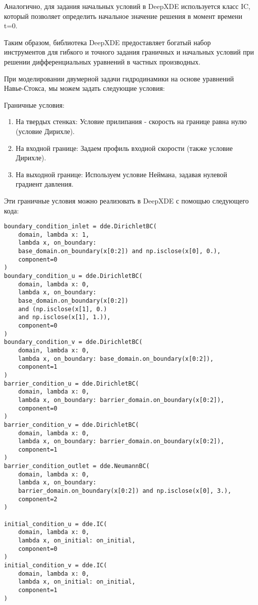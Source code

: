 Аналогично, для задания начальных условий в DeepXDE используется класс IC, который позволяет определить начальное значение
решения в момент времени t=0.

Таким образом, библиотека DeepXDE предоставляет богатый набор инструментов для гибкого и точного задания граничных и начальных
условий при решении дифференциальных уравнений в частных производных.

При моделировании двумерной задачи гидродинамики на основе уравнений Навье-Стокса, мы можем задать следующие условия:

Граничные условия:
\begin{enumerate}
    \item На твердых стенках: Условие прилипания - скорость на границе равна нулю (условие Дирихле).
    \item На входной границе: Задаем профиль входной скорости (также условие Дирихле).
    \item На выходной границе: Используем условие Неймана, задавая нулевой градиент давления.
\end{enumerate}
Эти граничные условия можно реализовать в DeepXDE с помощью следующего кода:
\begin{verbatim}
boundary_condition_inlet = dde.DirichletBC(
    domain, lambda x: 1,
    lambda x, on_boundary: 
    base_domain.on_boundary(x[0:2]) and np.isclose(x[0], 0.),
    component=0
)
boundary_condition_u = dde.DirichletBC(
    domain, lambda x: 0,
    lambda x, on_boundary: 
    base_domain.on_boundary(x[0:2]) 
    and (np.isclose(x[1], 0.) 
    and np.isclose(x[1], 1.)),
    component=0
)
boundary_condition_v = dde.DirichletBC(
    domain, lambda x: 0, 
    lambda x, on_boundary: base_domain.on_boundary(x[0:2]),
    component=1
)
barrier_condition_u = dde.DirichletBC(
    domain, lambda x: 0, 
    lambda x, on_boundary: barrier_domain.on_boundary(x[0:2]),
    component=0
)
barrier_condition_v = dde.DirichletBC(
    domain, lambda x: 0, 
    lambda x, on_boundary: barrier_domain.on_boundary(x[0:2]),
    component=1
)
barrier_condition_outlet = dde.NeumannBC(
    domain, lambda x: 0, 
    lambda x, on_boundary: 
    barrier_domain.on_boundary(x[0:2]) and np.isclose(x[0], 3.),
    component=2
)

initial_condition_u = dde.IC(
    domain, lambda x: 0,
    lambda x, on_initial: on_initial,
    component=0
)
initial_condition_v = dde.IC(
    domain, lambda x: 0,
    lambda x, on_initial: on_initial, 
    component=1
)
\end{verbatim}
    
